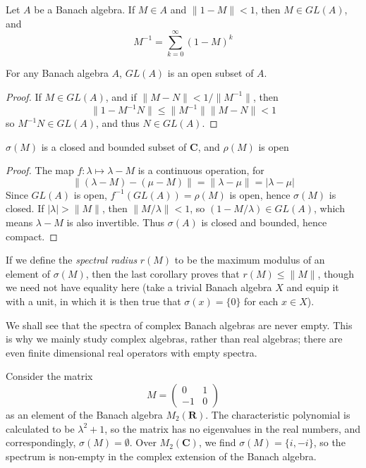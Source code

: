 \begin{corollary}
    Let $A$ be a Banach algebra. If $M \in A$ and $\| 1 - M \| < 1$, then $M \in GL(A)$, and
    \[ M^{-1} = \sum_{k = 0}^\infty (1 - M)^k \]
\end{corollary}

\begin{corollary}
    For any Banach algebra $A$, $GL(A)$ is an open subset of $A$.
\end{corollary}
\begin{proof}
    If $M \in GL(A)$, and if $\| M - N \| < 1/\| M^{-1} \|$, then
    \[ \| 1 - M^{-1}N \| \leq \| M^{-1} \| \| M - N \|  < 1 \]
    so $M^{-1}N \in GL(A)$, and thus $N \in GL(A)$.
\end{proof}

\begin{corollary}
    $\sigma(M)$ is a closed and bounded subset of $\mathbf{C}$, and $\rho(M)$ is open
\end{corollary}
\begin{proof}
    The map $f: \lambda \mapsto \lambda - M$ is a continuous operation, for
    \[ \| (\lambda - M) - (\mu - M) \| = \| \lambda - \mu \| = | \lambda - \mu | \]
    Since $GL(A)$ is open, $f^{-1}(GL(A)) = \rho(M)$ is open, hence $\sigma(M)$ is closed. If $|\lambda| > \|M\|$, then $\| M/\lambda \| < 1$, so $(1 - M/\lambda) \in GL(A)$, which means $\lambda - M$ is also invertible. Thus $\sigma(A)$ is closed and bounded, hence compact.
\end{proof}

If we define the \emph{spectral radius} $r(M)$ to be the maximum modulus of an element of $\sigma(M)$, then the last corollary proves that $r(M) \leq \| M \|$, though we need not have equality here (take a trivial Banach algebra $X$ and equip it with a unit, in which it is then true that $\sigma(x) = \{ 0 \}$ for each $x \in X$).

We shall see that the spectra of complex Banach algebras are never empty. This is why we mainly study complex algebras, rather than real algebras; there are even finite dimensional real operators with empty spectra.

\begin{example}
    Consider the matrix
    \[ M = \begin{pmatrix} 0 & 1 \\ -1 & 0 \end{pmatrix} \]
    as an element of the Banach algebra $M_2(\mathbf{R})$. The characteristic polynomial is calculated to be $\lambda^2 + 1$, so the matrix has no eigenvalues in the real numbers, and correspondingly, $\sigma(M) = \emptyset$. Over $M_2(\mathbf{C})$, we find $\sigma(M) = \{ i, -i \}$, so the spectrum is non-empty in the complex extension of the Banach algebra.
\end{example}

